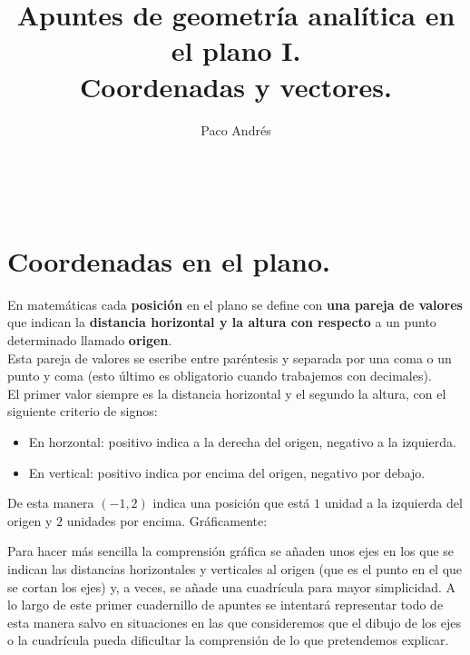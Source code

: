 \documentclass[a4paper,11pt,answers]{exam}
\def \autor{Paco Andrés}
\def \titulo{Apuntes de geometría analítica en el plano I.\\Coordenadas y vectores.}
\begin{document}
\title{\titulo}
\date{}
\author{\autor}
\maketitle

\begin{center}
\doclicenseLongText\\
\vspace{.25cm}
\doclicenseImage
\end{center}
\tableofcontents
\newpage

\section{Coordenadas en el plano.}

En matemáticas cada \textbf{posición} en el plano se define con \textbf{una pareja de valores}
que indican la \textbf{distancia horizontal y la altura con respecto} a un punto determinado
llamado \textbf{origen}.\\

Esta pareja de valores se escribe entre paréntesis y separada por una coma o un punto y coma
(esto último es obligatorio cuando trabajemos con decimales).\\

El primer valor siempre es la distancia horizontal y el segundo la altura, con el siguiente
criterio de signos:
\begin{itemize}
\item En horzontal: positivo indica a la derecha del origen, negativo a la izquierda.
\item En vertical: positivo indica por encima del origen, negativo por debajo.
\end{itemize}

De esta manera $(-1,2)$ indica una posición que está $1$ unidad a la izquierda del origen y
$2$ unidades por encima. Gráficamente:
\begin{center}
\end{center}

Para hacer más sencilla la comprensión gráfica se añaden unos ejes en los que se indican las
distancias horizontales y verticales al origen (que es el punto en el que se cortan los ejes)
y, a veces, se añade una cuadrícula para mayor
simplicidad. A lo largo de este primer cuadernillo de apuntes se intentará representar todo de
esta manera salvo en situaciones en las que consideremos que el dibujo de los ejes o la cuadrícula
pueda dificultar la comprensión de lo que pretendemos explicar.
\end{document}
